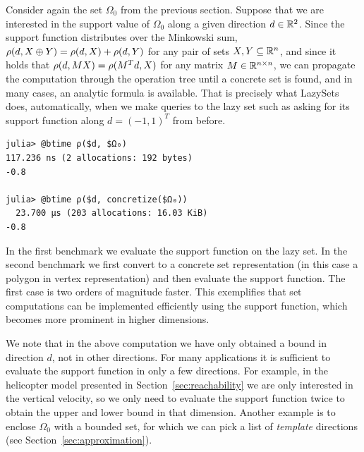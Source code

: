 Consider again the set $\Omega_0$ from the previous section. Suppose that we are interested in the support value of $\Omega_0$ along a given direction $d \in \mathbb{R}^2$.
%
Since the support function distributes over the Minkowski sum, $\rho(d, X \oplus Y) = \rho(d, X) + \rho(d, Y)$ for any pair of sets $X, Y \subseteq \mathbb{R}^n$, and since it holds that $\rho(d, M X) = \rho(M^T d, X)$ for any matrix $M \in \mathbb{R}^{n \times n}$, we can propagate the computation through the operation tree until a concrete set is found, and in many cases, an analytic formula is available.
%
That is precisely what LazySets does, automatically, when we make queries to the lazy set such as asking for its support function along $d = (-1, 1)^T$ from before.

\begin{minipage}{\linewidth}
	\vspace{-\abovedisplayskip}
	\begin{lstlisting}
julia> @btime ρ($d, $Ω₀)
117.236 ns (2 allocations: 192 bytes)
-0.8

julia> @btime ρ($d, concretize($Ω₀))
  23.700 μs (203 allocations: 16.03 KiB)
-0.8
	\end{lstlisting}
\end{minipage}

In the first benchmark we evaluate the support function on the lazy set.
In the second benchmark we first convert to a concrete set representation (in this case a polygon in vertex representation) and then evaluate the support function.
The first case is two orders of magnitude faster.
This exemplifies that set computations can be implemented efficiently using the support function, which becomes more prominent in higher dimensions.

We note that in the above computation we have only obtained a bound in direction $d$, not in other directions. For many applications it is sufficient to evaluate the support function in only a few directions. For example, in the helicopter model presented in Section~\ref{sec:reachability} we are only interested in the vertical velocity, so we only need to evaluate the support function twice to obtain the upper and lower bound in that dimension.
Another example is to enclose $\Omega_0$ with a bounded set, for which we can pick a list of \emph{template} directions (see Section~\ref{sec:approximation}).
